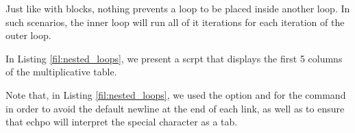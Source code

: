 Just like with  blocks, nothing prevents a loop to be placed inside another loop. In such scenarios, the inner loop will run all of it iterations for each iteration of the outer loop.

In Listing \ref{fil:nested_loops}, we present a scrpt that displays the first 5 columns of the multiplicative table.

Note that, in Listing \ref{fil:nested_loops}, we used the option  and  for the  command in order to avoid the default newline at the end of each link, as well as to ensure that echpo will interpret the special character  as a tab.
